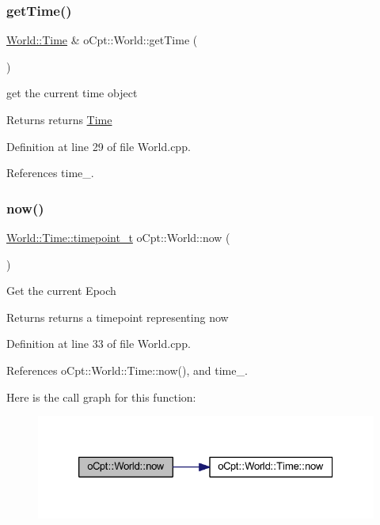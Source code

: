\subsubsection{\texorpdfstring{get\+Time()}{getTime()}}
{\footnotesize\ttfamily \hyperlink{classo_cpt_1_1_world_1_1_time}{World\+::\+Time} \& o\+Cpt\+::\+World\+::get\+Time (\begin{DoxyParamCaption}{ }\end{DoxyParamCaption})}

get the current time object \begin{DoxyReturn}{Returns}
returns \hyperlink{classo_cpt_1_1_world_1_1_time}{Time} 
\end{DoxyReturn}


Definition at line 29 of file World.\+cpp.



References time\+\_\+.

\hypertarget{classo_cpt_1_1_world_a82235ee23e403f81d38c04b813cdeb23}{}\label{classo_cpt_1_1_world_a82235ee23e403f81d38c04b813cdeb23} 
\subsubsection{\texorpdfstring{now()}{now()}}
{\footnotesize\ttfamily \hyperlink{classo_cpt_1_1_world_1_1_time_a6a6e782c3c90622c1c7070b0a223ec4c}{World\+::\+Time\+::timepoint\+\_\+t} o\+Cpt\+::\+World\+::now (\begin{DoxyParamCaption}{ }\end{DoxyParamCaption})}

Get the current Epoch \begin{DoxyReturn}{Returns}
returns a timepoint representing now 
\end{DoxyReturn}


Definition at line 33 of file World.\+cpp.



References o\+Cpt\+::\+World\+::\+Time\+::now(), and time\+\_\+.

Here is the call graph for this function\+:\nopagebreak
\begin{figure}[H]
\begin{center}
\leavevmode
\includegraphics[width=326pt]{classo_cpt_1_1_world_a82235ee23e403f81d38c04b813cdeb23_cgraph}
\end{center}
\end{figure}



